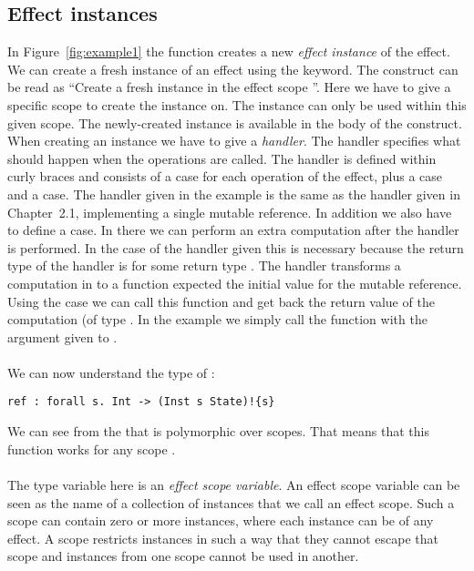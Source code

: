 \subsection{Effect instances}
In Figure~\ref{fig:example1} the function  creates a new \emph{effect instance} of the  effect.
We can create a fresh instance of an effect using the  keyword.
The construct  can be read as ``Create a fresh  instance in the effect scope ''.
Here we have to give a specific scope  to create the instance on.
The instance can only be used within this given scope.
The newly-created instance is available in the body of the  construct.
When creating an instance we have to give a \emph{handler}.
The handler specifies what should happen when the operations are called.
The handler is defined within curly braces and consists of a case for each operation of the effect, plus a  case and a  case.
The handler given in the example is the same as the handler given in Chapter~2.1, implementing a single mutable reference.
In addition we also have to define a  case.
In there we can perform an extra computation after the handler is performed.
In the case of the handler given this is necessary because the return type of the handler is  for some return type .
The handler transforms a computation in to a function expected the initial value for the mutable reference.
Using the  case we can call this function and get back the return value of the computation (of type .
In the example we simply call the function  with the argument  given to .
\\\\
We can now understand the type of :
\begin{verbatim}
ref : forall s. Int -> (Inst s State)!{s}
\end{verbatim}
We can see from the  that  is polymorphic over scopes.
That means that this function works for any scope .
\\\\
The type variable  here is an \emph{effect scope variable}.
An effect scope variable can be seen as the name of a collection of instances that we call an effect scope.
Such a scope can contain zero or more instances, where each instance can be of any effect.
A scope restricts instances in such a way that they cannot escape that scope and instances from one scope cannot be used in another.
